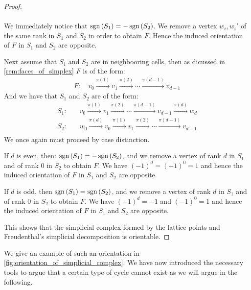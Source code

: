 \begin{proof}
\begin{case}{1}
\begin{align*}
		\end{align*}
		We immediately notice that $\operatorname{sgn}\left(S_1\right) = - \operatorname{sgn}\left(S_2\right)$. We remove a vertex $w_i, w_i'$ of the same rank in $S_1$ and $S_2$ in order to obtain $F$. Hence the induced orientation of $F$ in $S_1$ and $S_2$ are opposite.
	\end{case}
	\begin{case}{2}
		Next assume that $S_1$ and $S_2$ are in neighbooring cells, then as dicussed in \cref{rem:faces_of_simplex} $F$ is of the form:
		\begin{align*}
			F: \quad v_0 \xrightarrow{\pi(1)} v_1 \xrightarrow{\pi(2)} \cdots  \xrightarrow{\pi(d-1)} v_{d-1}
		\end{align*}
		And we have that $S_1$ and $S_2$ are of the form:
		\begin{align*}
			S_1: & \quad v_0 \xrightarrow{\pi(1)} v_1 \xrightarrow{\pi(2)} \cdots \xrightarrow{\pi(d-1)} v_{d-1} \xrightarrow{\pi(d)} w_d \\
			S_2: & \quad w_0 \xrightarrow{\pi(d)} v_0 \xrightarrow{\pi(1)} v_1 \xrightarrow{\pi(2)} \cdots \xrightarrow{\pi(d-1)} v_{d-1} \\
		\end{align*}
		We once again must proceed by case distinction.
		\begin{case}{2.1}
			If $d$ is even, then: $\operatorname{sgn}\left(S_1\right) = - \operatorname{sgn}\left(S_2\right)$, and we remove a vertex of rank $d$ in $S_1$ and of rank $0$ in $S_2$ to obtain $F$. We have $(-1)^d = (-1)^0 = 1$ and hence the induced orientation of $F$ in $S_1$ and $S_2$ are opposite.
		\end{case}
		\begin{case}{2.2}
			If $d$ is odd, then $\operatorname{sgn}\left(S_1\right) = \operatorname{sgn}\left(S_2\right)$, and we remove a vertex of rank $d$ in $S_1$ and of rank $0$ in $S_2$ to obtain $F$. We have $(-1)^d = -1$ and $(-1)^0 = 1$ and hence the induced orientation of $F$ in $S_1$ and $S_2$ are opposite.
		\end{case}
	\end{case}
	This shows that the simplicial complex formed by the lattice points and Freudenthal's simplicial decomposition is orientable.
\end{proof}

We give an example of such an orientation in \cref{fig:orientation_of_simplicial_complex}. We have now introduced the necessary tools to argue that a certain type of cycle cannot exist as we will argue in the following.

